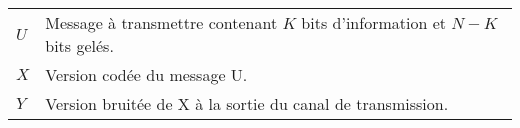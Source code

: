 \begin{center}
\begin{longtable}{ p{}  p{} }
    $U$                     & Message à transmettre contenant $K$ bits d'information et $N-K$ bits gelés.                                                                                                           \\
    $X$                     & Version codée du message U.                                                                                                                                                           \\
	$Y$                     & Version bruitée de X à la sortie du canal de transmission.                                                                                                                                  
\end{longtable}

\end{center}
\vspace*{\fill}
